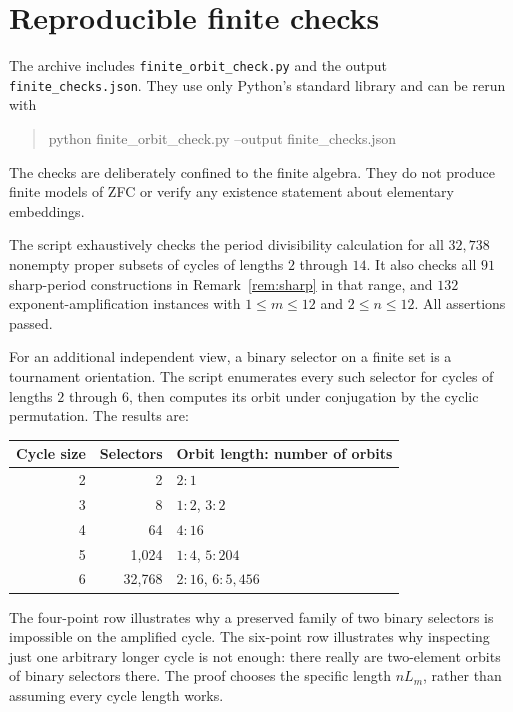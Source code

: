 \documentclass[11pt,letterpaper]{article}
\theoremstyle{definition}
\begin{document}
\clearpage
\appendix
\section{Reproducible finite checks}\label{app:checks}

The archive includes \nolinkurl{finite_orbit_check.py} and the output \nolinkurl{finite_checks.json}. They use only Python's standard library and can be rerun with
\begin{quote}\ttfamily\small
python finite\_orbit\_check.py --output finite\_checks.json
\end{quote}
The checks are deliberately confined to the finite algebra. They do not produce finite models of ZFC or verify any existence statement about elementary embeddings.

The script exhaustively checks the period divisibility calculation for all $32{,}738$ nonempty proper subsets of cycles of lengths $2$ through $14$. It also checks all $91$ sharp-period constructions in Remark~\ref{rem:sharp} in that range, and $132$ exponent-amplification instances with $1\leq m\leq12$ and $2\leq n\leq12$. All assertions passed.

For an additional independent view, a binary selector on a finite set is a tournament orientation. The script enumerates every such selector for cycles of lengths $2$ through $6$, then computes its orbit under conjugation by the cyclic permutation. The results are:
\begin{center}
\renewcommand{\arraystretch}{1.15}
\begin{tabularx}{\textwidth}{@{}rrY@{}}
\toprule
\textbf{Cycle size}&\textbf{Selectors}&\textbf{Orbit length: number of orbits}\\ & 2 & $2:1$\\
3 & 8 & $1:2$, $3:2$\\
4 & 64 & $4:16$\\
5 & 1,024 & $1:4$, $5:204$\\
6 & 32,768 & $2:16$, $6:5{,}456$\\
\bottomrule
\end{tabularx}
\end{center}

The four-point row illustrates why a preserved family of two binary selectors is impossible on the amplified cycle. The six-point row illustrates why inspecting just one arbitrary longer cycle is not enough: there really are two-element orbits of binary selectors there. The proof chooses the specific length $nL_m$, rather than assuming every cycle length works.
\end{document}
